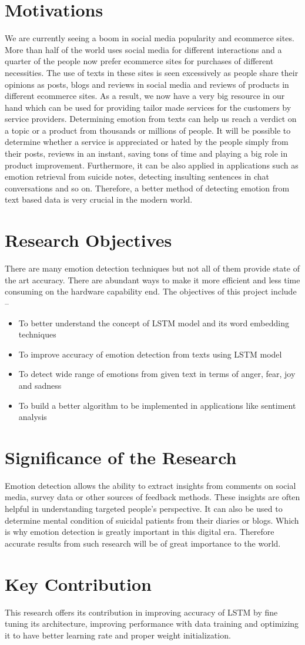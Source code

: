 \section{Motivations}

We are currently seeing a boom in social media popularity and ecommerce sites. More than half of the world uses social media for different interactions and a quarter of the people now prefer ecommerce sites for purchases of different necessities. The use of texts in these sites is seen excessively as people share their opinions as posts, blogs and reviews in social media and reviews of products in different ecommerce sites. As a result, we now have a very big resource in our hand which can be used for providing tailor made services for the customers by service providers. Determining emotion from texts can help us reach a verdict on a topic or a product from thousands or millions of people. It will be possible to determine whether a service is appreciated or hated by the people simply from their posts, reviews in an instant, saving tons of time and playing a big role in product improvement. Furthermore, it can be also applied in applications such as emotion retrieval from suicide notes, detecting insulting sentences in chat conversations and so on. Therefore, a better method of detecting emotion from text based data is very crucial in the modern world.

\section{Research Objectives}
There are many emotion detection techniques but not all of them provide state of
the art accuracy. There are abundant ways to make it more efficient and less time
consuming on the hardware capability end. The objectives of this project include –
\begin{itemize}
\item To better understand the concept of LSTM model and its word embedding techniques
\item To improve accuracy of emotion detection from texts using LSTM model
\item To detect wide range of emotions from given text in terms of anger, fear, joy and sadness 
\item To build a better algorithm to be implemented in applications like sentiment analysis
\end{itemize}

\section{Significance of the Research} 
Emotion detection allows the ability to extract insights from comments on social media, survey data or other sources of feedback methods. These insights are often helpful in understanding targeted people's perspective. It can also be used to determine mental condition of suicidal patients from their diaries or blogs. Which is why emotion detection is greatly important in this digital era. Therefore accurate results from such research will be of great importance to the world. 

\section{Key Contribution}
This research offers its contribution in improving accuracy of LSTM by fine tuning its architecture, improving performance with data training and optimizing it to have better learning rate and proper weight initialization.